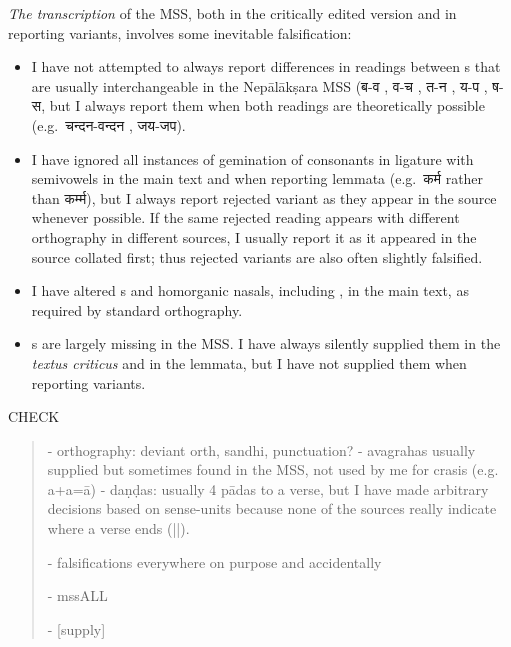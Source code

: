 \noindent
\textit{The transcription} of the MSS, both in the critically edited version and
in reporting variants, involves some inevitable falsification:

\begin{itemize}

\item I have not attempted to always report differences in readings between s that are usually
        interchangeable in the Nepālākṣara MSS ({\devanagarifont ब-व} , {\devanagarifont  व-च} , {\devanagarifont त-न} ,  
                {\devanagarifont य-प} , {\devanagarifont ष-स},
                but I always report them when both readings are
                theoretically possible (e.g.\ {\devanagarifont चन्दन}-{\devanagarifont वन्दन} , {\devanagarifont जय-जप}).


\item I have ignored all instances of gemination of consonants in ligature with semivowels in the main text 
and when reporting lemmata (e.g.\ {\devanagarifont कर्म} rather than {\devanagarifont कर्म्म}), 
but I always report rejected variant as they appear in the source whenever possible. If the same rejected reading
appears with different orthography in different sources, I usually report it as it appeared in the source collated first;
thus rejected variants are also often slightly falsified.


\item I have altered s and homorganic nasals, including , in the main text, as
       required by standard orthography.

\item {}s are largely missing in the MSS. I have always silently supplied them
        in the \textit{textus criticus} and in the lemmata, but I have not supplied them when reporting variants.


\end{itemize}

CHECK

\begin{quote}
- orthography: deviant orth, sandhi, punctuation?
- avagrahas usually supplied but sometimes found in the MSS, not used by me for crasis (e.g. a+a=ā)
- daṇḍas: usually 4 pādas to a verse, but I have made arbitrary decisions based on sense-units 
  because none of the sources really indicate where a verse ends (||).
  
- falsifications everywhere on purpose and accidentally

- mssALL

- [supply]
\end{quote}


